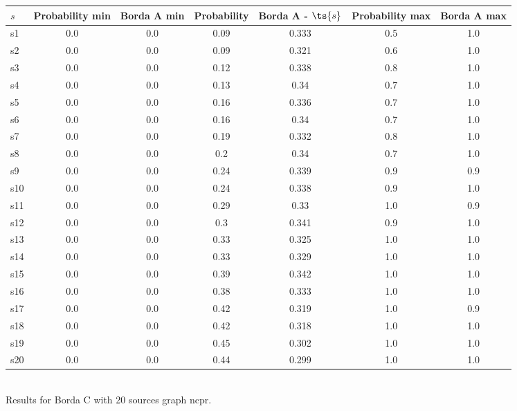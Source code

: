 \documentclass{article}
\begin{document}
\noindent\begin{tabular}{|l|c|c|c|c|c|c|}
\hline
$s$& Probability min & Borda A min & Probability & Borda A - $\ts{s}$ & Probability max & Borda A max\\
\hline
s1 &0.0 & 0.0 & 0.09 & 0.333 & 0.5 & 1.0\\
\hline
s2 &0.0 & 0.0 & 0.09 & 0.321 & 0.6 & 1.0\\
\hline
s3 &0.0 & 0.0 & 0.12 & 0.338 & 0.8 & 1.0\\
\hline
s4 &0.0 & 0.0 & 0.13 & 0.34 & 0.7 & 1.0\\
\hline
s5 &0.0 & 0.0 & 0.16 & 0.336 & 0.7 & 1.0\\
\hline
s6 &0.0 & 0.0 & 0.16 & 0.34 & 0.7 & 1.0\\
\hline
s7 &0.0 & 0.0 & 0.19 & 0.332 & 0.8 & 1.0\\
\hline
s8 &0.0 & 0.0 & 0.2 & 0.34 & 0.7 & 1.0\\
\hline
s9 &0.0 & 0.0 & 0.24 & 0.339 & 0.9 & 0.9\\
\hline
s10 &0.0 & 0.0 & 0.24 & 0.338 & 0.9 & 1.0\\
\hline
s11 &0.0 & 0.0 & 0.29 & 0.33 & 1.0 & 0.9\\
\hline
s12 &0.0 & 0.0 & 0.3 & 0.341 & 0.9 & 1.0\\
\hline
s13 &0.0 & 0.0 & 0.33 & 0.325 & 1.0 & 1.0\\
\hline
s14 &0.0 & 0.0 & 0.33 & 0.329 & 1.0 & 1.0\\
\hline
s15 &0.0 & 0.0 & 0.39 & 0.342 & 1.0 & 1.0\\
\hline
s16 &0.0 & 0.0 & 0.38 & 0.333 & 1.0 & 1.0\\
\hline
s17 &0.0 & 0.0 & 0.42 & 0.319 & 1.0 & 0.9\\
\hline
s18 &0.0 & 0.0 & 0.42 & 0.318 & 1.0 & 1.0\\
\hline
s19 &0.0 & 0.0 & 0.45 & 0.302 & 1.0 & 1.0\\
\hline
s20 &0.0 & 0.0 & 0.44 & 0.299 & 1.0 & 1.0\\
\hline
\end{tabular}\\

\noindent Results for Borda C with 20 sources graph ncpr.
\end{document}
